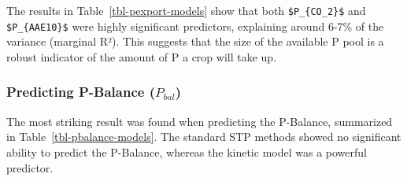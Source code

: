 \documentclass[
  a4paper,
]{article}
\begin{document}
The results in Table~\ref{tbl-pexport-models} show that both
\texttt{\$P\_\{CO\_2\}\$} and \texttt{\$P\_\{AAE10\}\$} were highly
significant predictors, explaining around 6-7\% of the variance
(marginal R²). This suggests that the size of the available P pool is a
robust indicator of the amount of P a crop will take up.

\subsubsection{\texorpdfstring{Predicting P-Balance
(\(P_{bal}\))}{Predicting P-Balance (P\_\{bal\})}}\label{sec-pbalance}

The most striking result was found when predicting the P-Balance,
summarized in Table~\ref{tbl-pbalance-models}. The standard STP methods
showed no significant ability to predict the P-Balance, whereas the
kinetic model was a powerful predictor.
\end{document}
